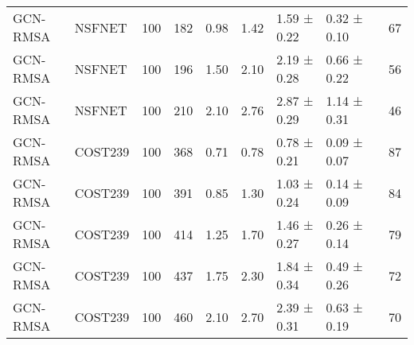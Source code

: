 \begin{longtable}[!htbp]{llll|lllll|l}
GCN-RMSA             & NSFNET            & 100                  & 182                                                               & 0.98 & \multicolumn{1}{l|}{1.42}    & 1.59 ± 0.22 & 0.32 ± 0.10      &                   & 67                                                                                    \\
GCN-RMSA             & NSFNET            & 100                  & 196                                                               & 1.50  & \multicolumn{1}{l|}{2.10}     & 2.19 ± 0.28 & 0.66 ± 0.22      &                   & 56                                                                                    \\
GCN-RMSA             & NSFNET            & 100                  & 210                                                               & 2.10  & \multicolumn{1}{l|}{2.76}    & 2.87 ± 0.29 & 1.14 ± 0.31      &                   & 46                                                                                    \\
GCN-RMSA             & COST239           & 100                  & 368                                                               & 0.71 & \multicolumn{1}{l|}{0.78}    & 0.78 ± 0.21 & 0.09 ± 0.07      &                   & 87                                                                                    \\
GCN-RMSA             & COST239           & 100                  & 391                                                               & 0.85 & \multicolumn{1}{l|}{1.30}     & 1.03 ± 0.24    & 0.14 ± 0.09      &                   & 84                                                                                    \\
GCN-RMSA             & COST239           & 100                  & 414                                                               & 1.25 & \multicolumn{1}{l|}{1.70}     & 1.46 ± 0.27 & 0.26 ± 0.14      &                   & 79                                                                                    \\
GCN-RMSA             & COST239           & 100                  & 437                                                               & 1.75 & \multicolumn{1}{l|}{2.30}     & 1.84 ± 0.34 & 0.49 ± 0.26      &                   & 72                                                                                    \\
GCN-RMSA             & COST239           & 100                  & 460                                                               & 2.10  & \multicolumn{1}{l|}{2.70}     & 2.39 ± 0.31 & 0.63 ± 0.19      &                   & 70                                                                                    \\

\end{longtable}
